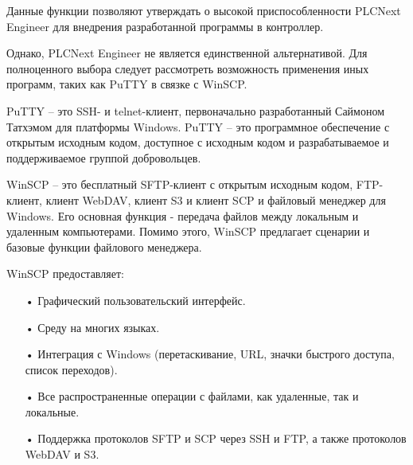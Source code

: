 {\begin{itemize}[leftmargin=2.15cm, labelwidth=0.65cm, labelsep=0.0cm]
		\addtocounter{itemcntr}{1}
		
		\setcounter{itemcntr}{1}
	\end{itemize} 	
	
	\par \redline Данные функции позволяют утверждать о высокой приспособленности PLCNext Engineer для внедрения разработанной программы в контроллер.
	
	\par \redline Однако, PLCNext Engineer не является единственной альтернативой. Для полноценного выбора следует рассмотреть возможность применения иных программ, таких как PuTTY в связке с WinSCP.
	
	\par \redline PuTTY {--} это SSH- и telnet-клиент, первоначально разработанный Саймоном Татхэмом для платформы Windows. PuTTY {--} это программное обеспечение с открытым исходным кодом, доступное с исходным кодом и разрабатываемое и поддерживаемое группой добровольцев.
	
	\par \redline WinSCP {--} это бесплатный SFTP-клиент с открытым исходным кодом, FTP-клиент, клиент WebDAV, клиент S3 и клиент SCP и файловый менеджер для Windows. Его основная функция - передача файлов между локальным и удаленным компьютерами. Помимо этого, WinSCP предлагает сценарии и базовые функции файлового менеджера.
	
	\par \redline WinSCP предоставляет:
	
	
	\begin{itemize}[leftmargin=2.15cm, labelwidth=0.65cm, labelsep=0.0cm] 
		
		\item[•] 	Графический пользовательский интерфейс.  
		\addtocounter{itemcntr}{1}
		
		\item[•] Среду на многих языках.
		
		\addtocounter{itemcntr}{1}
		
		\item[•] Интеграция с Windows (перетаскивание, URL, значки быстрого доступа, список переходов). 
		
		\addtocounter{itemcntr}{1}
		
		\item[•] Все распространенные операции с файлами, как удаленные, так и локальные.  
		
		\addtocounter{itemcntr}{1}
		
		\item[•] Поддержка протоколов SFTP и SCP через SSH и FTP, а также протоколов WebDAV и S3. 
		

\end{itemize}}

